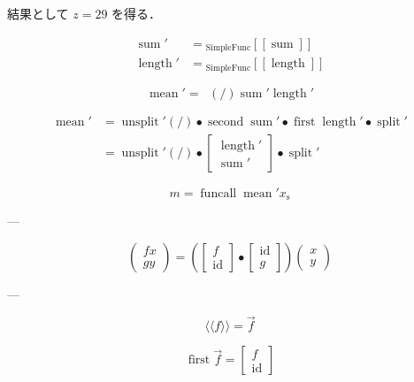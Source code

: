 \documentclass[a5paper,twoside,fleqn,draft]{jsbook}
\def\[{[\![}
\def\]{]\!]}
\def\llangle{\langle\!\langle}
\def\rrangle{\rangle\!\rangle}
\newcommand{\Langle}{\llangle}
\newcommand{\Rangle}{\rrangle}
\newcommand{\mSpecialFunc}[1]{\mathrm{#1}}
\DeclareMathOperator{\mFirst}{\mSpecialFunc{first}}
\DeclareMathOperator{\mFuncall}{\mSpecialFunc{funcall}}
\DeclareMathOperator{\mId}{\mSpecialFunc{id}}
\DeclareMathOperator{\mLength}{\mSpecialFunc{length}}
\DeclareMathOperator{\mLiftATwo}{\mSpecialFunc{liftA}_2}
\DeclareMathOperator{\mMean}{\mSpecialFunc{mean}}
\DeclareMathOperator{\mSecond}{\mSpecialFunc{second}}
\DeclareMathOperator{\mSplit}{\mSpecialFunc{split}}
\DeclareMathOperator{\mSum}{\mSpecialFunc{sum}}
\DeclareMathOperator{\mUnsplit}{\mSpecialFunc{unsplit}}
\DeclareMathOperator{\mCompCat}{\bullet}
\newcommand{\mValueConstructor}[1]{\mathrm{#1}}
\newcommand{\mValueWith}[2]{{}_\mValueConstructor{#1}\[#2\]}
\newcommand{\mArrowWith}[1]{\Langle#1\Rangle}
\newcommand{\mArrow}[1]{\Vec{#1}}
\newcommand{\mList}[1]{{#1}_\mathrm{s}}
\begin{document}
結果として $z=29$ を得る．

\begin{align}
  \mSum'
  &=\mValueWith{SimpleFunc}{\mSum}\\
  \mLength'
  &=\mValueWith{SimpleFunc}{\mLength}
\end{align}

\begin{equation}
  \mMean'
  =\mLiftATwo(/)\mSum'\mLength'
\end{equation}

\begin{align}
  \mMean'
  &=\mUnsplit'(/)\mCompCat\mSecond\mSum'\mCompCat\mFirst\mLength'\mCompCat\mSplit'\\
  &=\mUnsplit'(/)\mCompCat\begin{bmatrix}\mLength'\\\mSum'\end{bmatrix}\mCompCat\mSplit'
\end{align}

\begin{equation}
  m
  =\mFuncall\mMean'\mList{x}
\end{equation}


---

\begin{equation}
  \begin{pmatrix}
    fx\\
    gy
  \end{pmatrix}
  =
  \left(
  \begin{bmatrix}
    f\\
    \mId
  \end{bmatrix}
  \mCompCat
  \begin{bmatrix}
    \mId\\
    g
  \end{bmatrix}
  \right)
  \begin{pmatrix}
    x\\
    y
  \end{pmatrix}
\end{equation}

---

\begin{equation}
  \mArrowWith{f}=\mArrow{f}
\end{equation}

\begin{equation}
  \mFirst\mArrow{f}=\begin{bmatrix}f\\\mId\end{bmatrix}
\end{equation}
\end{document}
